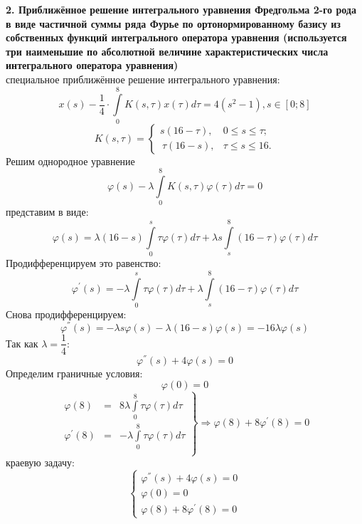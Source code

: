 \documentclass[12pt]{article}
\begin{document}
\textbf{2. Приближённое решение интегрального уравнения Фредгольма 2-го рода в виде 
частичной суммы ряда Фурье по ортонормированному базису из собственных 
функций интегрального оператора уравнения (используется три наименьшие по 
абсолютной величине характеристических числа интегрального оператора 
уравнения)}\\
 специальное приближённое решение интегрального уравнения:
$$x(s)-\frac{1}{4}\cdot\int\limits_{0}^{8}K(s,\tau)x(\tau)d\tau=4(s^2-1), s\in[0;8]$$
\begin{equation*}
K(s,\tau) = 
 \begin{cases}
   s(16-\tau), &0\leq s\leq \tau;\\\
   \tau(16-s), &\tau\leq s\leq 16.
 \end{cases}
\end{equation*}
\indent Решим однородное уравнение
$$\varphi(s)-\lambda\int\limits_{0}^{8}K(s,\tau)\varphi(\tau)d\tau=0$$
\indent представим в виде:
$$\varphi(s)=\lambda(16-s)\int\limits_{0}^{s}\tau\varphi(\tau)d\tau +
\lambda s\int\limits_{s}^{8}(16-\tau)\varphi(\tau)d\tau$$
\indent Продифференцируем это равенство:
$$\varphi^{'}(s)=-\lambda\int\limits_{0}^{s}\tau\varphi(\tau)d\tau
+\lambda\int\limits_{s}^{8}(16-\tau)\varphi(\tau)d\tau$$
\indent Снова продифференцируем:
$$\varphi^{''}(s)=-\lambda s \varphi(s) - \lambda (16-s) \varphi(s) = -16\lambda\varphi(s) $$
Так как $\lambda = \dfrac 1 4$:
$$\varphi^{''}(s)+4\varphi(s)=0$$
\indent Определим граничные условия:
$$\varphi(0)=0$$
$$\left.
  \begin{array}{ccc}
    \varphi(8) & = & 	
    8 \lambda \int\limits_{0}^{8}\tau\varphi(\tau)d\tau \\
    \varphi^{'}(8) & = & -\lambda\int\limits_{0}^{8}\tau\varphi(\tau)d\tau \\
  \end{array}
\right\} \Rightarrow \varphi(8)+8\varphi^{'}(8)=0$$
 краевую задачу:
\begin{equation*}
	\begin{cases}
		\varphi^{''}(s)+4\varphi(s)=0
		\\
		\varphi(0)=0 \\
		\varphi(8)+8\varphi^{'}(8)=0
	\end{cases}
\end{equation*}
\end{document}
